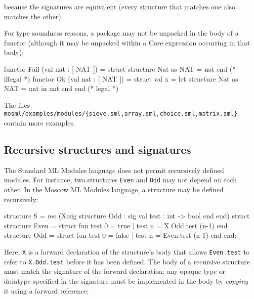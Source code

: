 \documentclass[fleqn,a4paper]{article}
\begin{document}
\begin{program}
[sig type t val x: t type u = t val y: u end]
[sig type u val x: u type t = u val y: t end]
\end{program}

\noindent 
because the signatures are equivalent (every structure that matches
one also matches the other).

For type soundness reasons, a package may not be unpacked in the body
of a functor (although it may be unpacked within a Core expression
occurring in that body):

\begin{program}
functor Fail (val nat : [ NAT ]) = 
  struct structure Nat as NAT = nat end                        (* illegal *)
functor Ok (val nat : [ NAT ]) = 
  struct val x = let structure Nat as NAT = nat in nat end end (* legal *)
\end{program}

\noindent 
The files {\tt
  mosml/examples/modules/\{sieve.sml,array.sml,choice.sml,matrix.sml\}}
contain more examples.


\subsection{Recursive structures and signatures}
\label{sec-rec-modules}

The Standard ML Modules language does not permit recursively defined
modules.  For instance, two structures \texttt{Even} and \texttt{Odd}
may not depend on each other.  In the Moscow ML Modules language, a
structure may be defined recursively:

\begin{program}
structure S = rec (X:sig structure Odd : sig val test : int -> bool end end)  
              struct structure Even = struct fun test 0 = true 
                                               | test n = X.Odd.test (n-1)
                                      end        
                     structure Odd  = struct fun test 0 = false
                                               | test n = Even.test (n-1)
                                      end               
              end;
\end{program}

\noindent
Here, \texttt{X} is a forward declaration of the structure's body
that allows \texttt{Even.test} to refer to
\texttt{X.Odd.test} before it has been defined.
The body of a recursive structure must match the signature of
the forward declaration; any opaque type or datatype 
specified in the signature must be implemented in the body
by \emph{copying} it using a forward reference:
\end{document}
